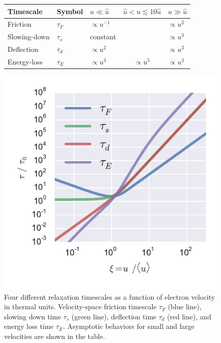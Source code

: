 \documentclass{emulateapj}
\newcommand\ubar{\ensuremath{\hat{u}}}
\begin{document}
\begin{figure}
  \centering
  \begin{tabular}{lllcl}\hline
    Timescale & Symbol & \(u \ll \ubar\) & \(\ubar < u \lesssim 10\ubar\) & \(u \gg \ubar\) \\ \hline
    Friction & \(\tau_F\) & \(\propto u^{-1} \) & & \(\propto u^{2} \) \\
    Slowing-down & \(\tau_s\) & constant & & \(\propto u^{3} \) \\
    Deflection & \(\tau_d\) & \(\propto u^{2} \) & & \(\propto u^{3} \) \\ 
    Energy-loss & \(\tau_E\) & \(\propto u^{3} \) & \(\propto u^{5} \)& \(\propto u^{3} \) \\
    \hline
  \end{tabular}
  \includegraphics[width=0.9\linewidth]{relax_timescales}
  \caption{Four different relaxation timescales as a
    function of electron velocity in thermal units. Velocity-space
    friction timescale \(\tau_F\)
    (blue line), slowing down time \(\tau_s\)
    (green line), deflection time \(\tau_d\)
    (red line), and energy loss time \(\tau_E\).
    Asymptotic behaviors for small and large velocities are shown in
    the table.
    }
  \label{fig:relax}
\end{figure}
\end{document}
